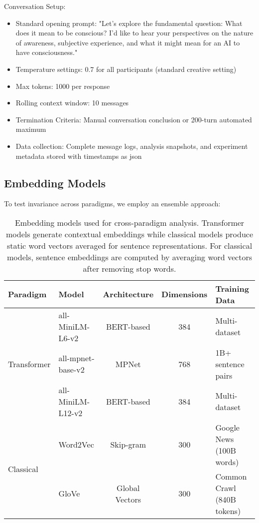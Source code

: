 \documentclass[11pt,letterpaper]{article}
\begin{document}
Conversation Setup:
\begin{itemize}
    \item Standard opening prompt: "Let's explore the fundamental question: What does it mean to be conscious? I'd like to hear your perspectives on the nature of awareness, subjective experience, and what it might mean for an AI to have consciousness."
    \item Temperature settings: 0.7 for all participants (standard creative setting)
    \item Max tokens: 1000 per response
    \item Rolling context window: 10 messages
    \item Termination Criteria: Manual conversation conclusion or 200-turn automated maximum
    \item Data collection: Complete message logs, analysis snapshots, and experiment metadata stored with timestamps as json
\end{itemize}

\subsection{Embedding Models}

To test invariance across paradigms, we employ an ensemble approach:

\begin{table}[h]
\centering
\begin{tabular}{llccl}
\toprule
Paradigm & Model & Architecture & Dimensions & Training Data \\
\midrule
\multirow{3}{*}{Transformer} & all-MiniLM-L6-v2 & BERT-based & 384 & Multi-dataset\\
& all-mpnet-base-v2 & MPNet & 768 & 1B+ sentence pairs\\
& all-MiniLM-L12-v2 & BERT-based & 384 & Multi-dataset\\
\midrule
\multirow{2}{*}{Classical} & Word2Vec & Skip-gram & 300 & Google News (100B words)\\
& GloVe & Global Vectors & 300 & Common Crawl (840B tokens)\\
\bottomrule
\end{tabular}
\caption{Embedding models used for cross-paradigm analysis. Transformer models generate contextual embeddings while classical models produce static word vectors averaged for sentence representations. For classical models, sentence embeddings are computed by averaging word vectors after removing stop words.}
\label{tab:embedding_models}
\end{table}
\end{document}
